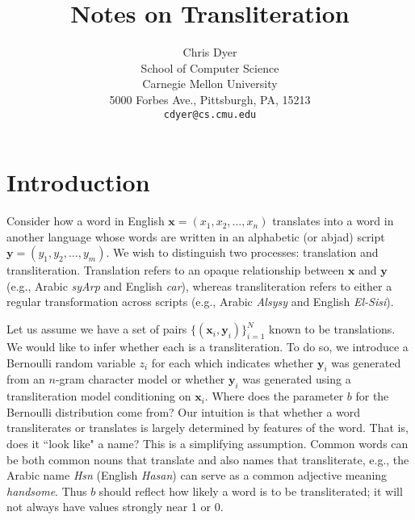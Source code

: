 \documentclass[11pt]{article}
\title{Notes on Transliteration}
\author{Chris Dyer \\
  School of Computer Science \\
  Carnegie Mellon University \\
  5000 Forbes Ave., Pittsburgh, PA, 15213 \\
  {\tt cdyer@cs.cmu.edu} \\}
\date{}
\begin{document}
\maketitle
\begin{abstract}
\end{abstract}

\section{Introduction}
Consider how a word in English $\boldsymbol{x}=(x_1,x_2,\ldots,x_n)$ translates into a word in another language whose words are written in an alphabetic (or abjad) script $\boldsymbol{y}=(y_1,y_2,\ldots,y_m)$. We wish to distinguish two processes: translation and transliteration. Translation refers to an opaque relationship between $\boldsymbol{x}$ and $\boldsymbol{y}$ (e.g., Arabic \emph{syArp} and English \emph{car}), whereas transliteration refers to either a regular transformation across scripts (e.g., Arabic \emph{Alsysy} and English \emph{El-Sisi}).

Let us assume we have a set of pairs $\{(\boldsymbol{x}_i, \boldsymbol{y}_i)\}_{i=1}^N$ known to be translations. We would like to infer whether each is a transliteration. To do so, we introduce a Bernoulli random variable $z_i$ for each which indicates whether $\boldsymbol{y}_i$ was generated from an $n$-gram character model or whether $\boldsymbol{y}_i$ was generated using a transliteration model conditioning on $\boldsymbol{x}_i$. Where does the parameter $b$ for the Bernoulli distribution come from? Our intuition is that whether a word transliterates or translates is largely determined by features of the word. That is, does it ``look like" a name? This is a simplifying assumption. Common words can be both common nouns that translate and also names that transliterate, e.g., the Arabic name  \emph{Hsn} (English \emph{Hasan}) can serve as a common adjective meaning \emph{handsome}. Thus $b$ should reflect how likely a word is to be transliterated; it will not always have values strongly near 1 or 0.
\end{document}
